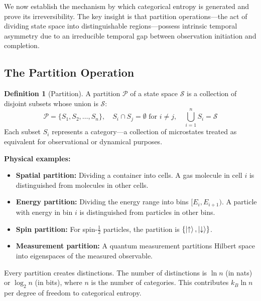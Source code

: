 \documentclass[twocolumn,10pt]{article}
\theoremstyle{definition}
\newtheorem{definition}[theorem]{Definition}
\theoremstyle{remark}
\begin{document}
We now establish the mechanism by which categorical entropy is generated and prove its irreversibility. The key insight is that partition operations—the act of dividing state space into distinguishable regions—possess intrinsic temporal asymmetry due to an irreducible temporal gap between observation initiation and completion.

\subsection{The Partition Operation}

\begin{definition}[Partition]
A partition $\mathcal{P}$ of a state space $\mathcal{S}$ is a collection of disjoint subsets whose union is $\mathcal{S}$:
$$
\mathcal{P} = \{S_1, S_2, \ldots, S_n\}, \quad S_i \cap S_j = \emptyset \text{ for } i \neq j, \quad \bigcup_{i=1}^n S_i = \mathcal{S}
$$
Each subset $S_i$ represents a category—a collection of microstates treated as equivalent for observational or dynamical purposes.
\end{definition}

\textbf{Physical examples:}

\begin{itemize}
\item \textbf{Spatial partition:} Dividing a container into cells. A gas molecule in cell $i$ is distinguished from molecules in other cells.

\item \textbf{Energy partition:} Dividing the energy range into bins $[E_i, E_{i+1})$. A particle with energy in bin $i$ is distinguished from particles in other bins.

\item \textbf{Spin partition:} For spin-$\frac{1}{2}$ particles, the partition is $\{\ket{\uparrow}, \ket{\downarrow}\}$.

\item \textbf{Measurement partition:} A quantum measurement partitions Hilbert space into eigenspaces of the measured observable.
\end{itemize}

Every partition creates distinctions. The number of distinctions is $\ln n$ (in nats) or $\log_2 n$ (in bits), where $n$ is the number of categories. This contributes $k_B \ln n$ per degree of freedom to categorical entropy.
\end{document}
